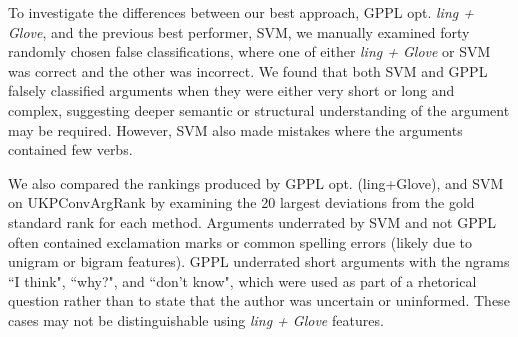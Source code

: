To investigate the differences between our best approach, GPPL opt. \emph{ling + Glove}, 
and the previous best performer, SVM, 
we manually examined forty randomly chosen false classifications, where one of 
either  \emph{ling + Glove} or SVM was correct and the other was incorrect. 
We found that both SVM and GPPL falsely classified arguments when they were either very short or long and complex, suggesting deeper semantic or structural understanding of the argument may be required. However, SVM also made mistakes
where the arguments contained few verbs.

We also compared the rankings produced by GPPL opt. (ling+Glove), 
and SVM on UKPConvArgRank by examining the 20 largest deviations from the 
gold standard rank for each method. Arguments underrated by SVM and not GPPL often 
contained exclamation marks or common spelling errors (likely due to unigram or bigram features).
GPPL underrated short arguments with the ngrams ``I think", ``why?", and
``don't know", which were used as part of a rhetorical question
rather than to state that the author was uncertain or uninformed.
These cases may not be distinguishable using \emph{ling + Glove} features.


